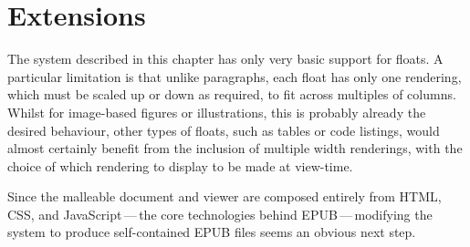 


\section{Extensions}
\label{sec:future}
The system described in this chapter has only very basic support for floats. A particular limitation is that unlike paragraphs, each float has only one rendering, which must be scaled up or down as required, to fit across multiples of columns. Whilst for image-based figures or illustrations, this is probably already the desired behaviour, other types of floats, such as tables or code listings, would almost certainly benefit from the inclusion of multiple width renderings, with the choice of which rendering to display to be made at view-time. %


Since the malleable document and viewer are composed entirely from HTML, CSS, and JavaScript\,---\,the core technologies behind EPUB\,---\,modifying the system to produce self-contained EPUB files seems an obvious next step.


